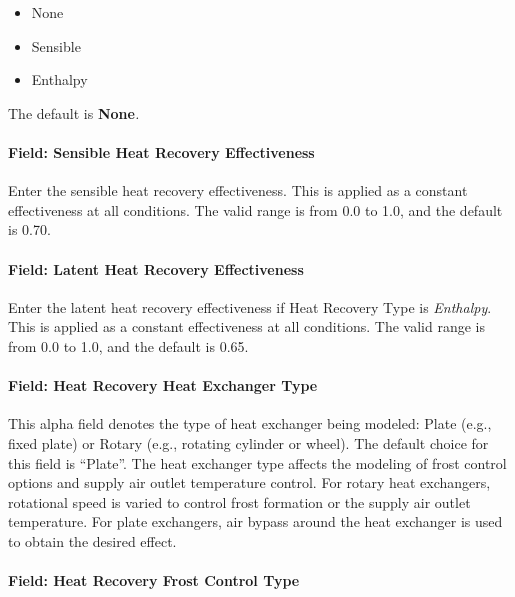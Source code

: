 \begin{itemize}
\item
  None
\item
  Sensible
\item
  Enthalpy
\end{itemize}

The default is \textbf{None}\emph{.}

\paragraph{Field: Sensible Heat Recovery Effectiveness}\label{field-sensible-heat-recovery-effectiveness-7}

Enter the sensible heat recovery effectiveness. This is applied as a constant effectiveness at all conditions. The valid range is from 0.0 to 1.0, and the default is 0.70.

\paragraph{Field: Latent Heat Recovery Effectiveness}\label{field-latent-heat-recovery-effectiveness-7}

Enter the latent heat recovery effectiveness if Heat Recovery Type is \emph{Enthalpy}. This is applied as a constant effectiveness at all conditions. The valid range is from 0.0 to 1.0, and the default is 0.65.

\paragraph{Field: Heat Recovery Heat Exchanger Type}\label{field-heat-recovery-heat-exchanger-type-2}

This alpha field denotes the type of heat exchanger being modeled: Plate (e.g., fixed plate) or Rotary (e.g., rotating cylinder or wheel). The default choice for this field is ``Plate''. The heat exchanger type affects the modeling of frost control options and supply air outlet temperature control. For rotary heat exchangers, rotational speed is varied to control frost formation or the supply air outlet temperature. For plate exchangers, air bypass around the heat exchanger is used to obtain the desired effect.

\paragraph{Field: Heat Recovery Frost Control Type}\label{field-heat-recovery-frost-control-type-2}


